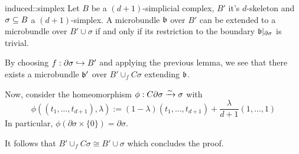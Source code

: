 \begin{mycorollary}{induced::simplex}
    Let $B$ be a $(d + 1)$-simplicial complex, $B'$ it's $d$-skeleton and $\sigma \subseteq{} B$ a $(d + 1)$-simplex.
    A microbundle $\mathfrak{b}$ over $B'$ can be extended to a microbundle over $B' \cup \sigma$ if and only if its restriction to the boundary $\mathfrak{b} \vert_{\partial \sigma}$ is trivial.
\end{mycorollary}
\begin{myproof}
    By choosing $f: \partial \sigma \hookrightarrow{} B'$ and applying the previous lemma,
    we see that there exists a microbundle $\mathfrak{b}'$ over $B' \cup_f C\sigma$ extending $\mathfrak{b}$.

    Now, consider the homeomorphism $\phi: C\partial \sigma \xrightarrow{\sim} \sigma$ with
    \[ \phi((t_1, \dots, t_{d + 1}), \lambda) := (1 - \lambda) (t_1, \dots, t_{d + 1}) + \frac{\lambda}{d + 1} (1, \dots, 1) \]
    In particular, $\phi(\partial \sigma \times \{0\}) = \partial \sigma$.

    It follows that $B' \cup_f C\sigma \cong B' \cup \sigma$ which concludes the proof.
\end{myproof}